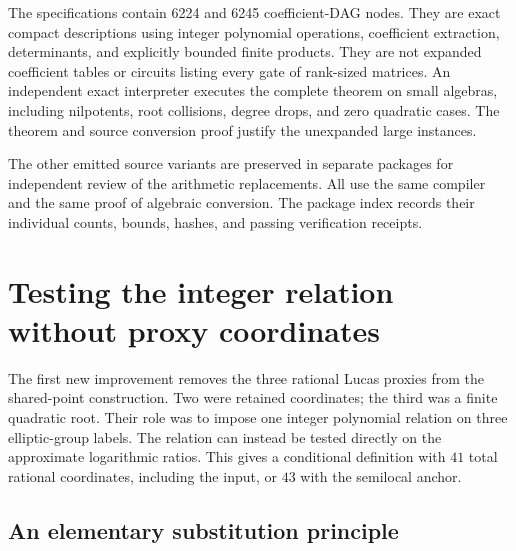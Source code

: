 \documentclass[11pt]{article}
\theoremstyle{definition}
\begin{document}
The specifications contain 6224 and 6245 coefficient-DAG nodes.
They are exact compact descriptions using integer polynomial
operations, coefficient extraction, determinants, and explicitly
bounded finite products.  They are not expanded coefficient
tables or circuits listing every gate of rank-sized matrices.
An independent exact interpreter executes the complete theorem
on small algebras, including nilpotents, root collisions, degree
drops, and zero quadratic cases.  The theorem and source conversion
proof justify the unexpanded large instances.

The other emitted source variants are preserved in separate
packages for independent review of the arithmetic replacements.
All use the same compiler and the same proof of algebraic
conversion.  The package index records their individual counts,
bounds, hashes, and passing verification receipts.


\section{Testing the integer relation without proxy coordinates}
\label{sec:direct-integer-relation}

The first new improvement removes the three rational Lucas proxies
from the shared-point construction.  Two were retained coordinates;
the third was a finite quadratic root.  Their role was to impose
one integer polynomial relation on three elliptic-group labels.
The relation can instead be tested directly on the approximate
logarithmic ratios.  This gives a conditional definition with
$41$ total rational coordinates, including the input, or $43$
with the semilocal anchor.

\subsection{An elementary substitution principle}
\end{document}
